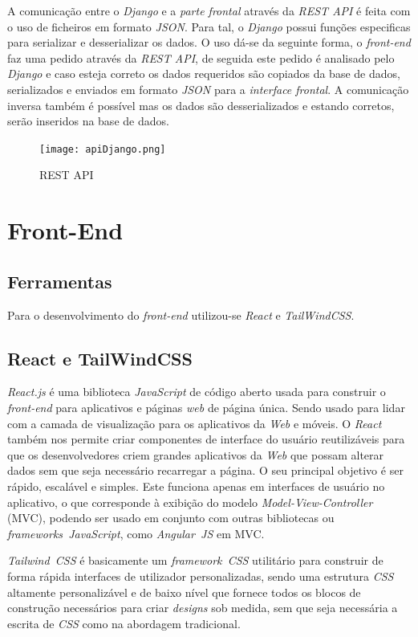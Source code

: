 \documentclass[11pt,a4paper]{report}
\begin{document}
A comunicação entre o \emph{Django} e a \emph{parte frontal} através da \emph{REST API} é feita com o uso de ficheiros em formato \emph{JSON}. Para tal, o \emph{Django} possui funções especificas para serializar e desserializar os dados. O uso dá-se da seguinte forma, o \emph{front-end} faz uma pedido através da \emph{REST API}, de seguida este pedido é analisado pelo \emph{Django} e caso esteja correto os dados requeridos são copiados da base de dados, serializados e enviados em formato \emph{JSON} para a \emph{interface frontal}. A comunicação inversa também é possível mas os dados são desserializados e estando corretos, serão inseridos na base de dados.

\begin{figure}[h]
\centering
\texttt{[image: apiDjango.png]}
\caption{REST API}
\label{fig:pagDJang}
\end{figure}

\chapter{Front-End}

\section{Ferramentas}
Para o desenvolvimento do  \emph{front-end} utilizou-se \emph{React} e \emph{TailWindCSS}.

\section{React e TailWindCSS}

\emph{React.js} é uma biblioteca \emph{JavaScript} de código aberto usada para construir o \emph{front-end} para aplicativos e páginas \emph{web} de página única. Sendo usado para lidar com a camada de visualização para os aplicativos da \emph{Web} e móveis. O \emph{React} também nos permite criar componentes de interface do usuário reutilizáveis para que os desenvolvedores criem grandes aplicativos da \emph{Web} que possam alterar dados sem que seja necessário recarregar a página. O seu principal objetivo é ser rápido, escalável e simples. Este funciona apenas em interfaces de usuário no aplicativo, o que corresponde à exibição do modelo \emph{Model-View-Controller} (MVC), podendo ser usado em conjunto com outras bibliotecas ou \emph{frameworks\ JavaScript}, como \emph{Angular\ JS} em MVC.

\emph{Tailwind\ CSS} é basicamente um \emph{framework\ CSS} utilitário para construir de forma rápida interfaces de utilizador personalizadas, sendo uma estrutura \emph{CSS} altamente personalizável e de baixo nível que fornece todos os blocos de construção necessários para criar \emph{designs} sob medida, sem que seja necessária a escrita de \emph{CSS} como na abordagem tradicional.
\end{document}
